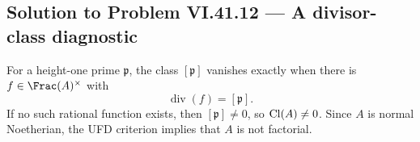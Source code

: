 \subsection*{Solution to Problem VI.41.12 — A divisor-class diagnostic}
\begin{solution}
For a height-one prime \(\mathfrak p\), the class \([\mathfrak p]\) vanishes exactly when
there is \(f\in\Frac(A)^\times\) with
\[
\operatorname{div}(f)=[\mathfrak p].
\]
If no such rational function exists, then \([\mathfrak p]\neq0\), so
\(\operatorname{Cl}(A)\neq0\). Since \(A\) is normal Noetherian, the UFD criterion implies that
\(A\) is not factorial.
\end{solution}

